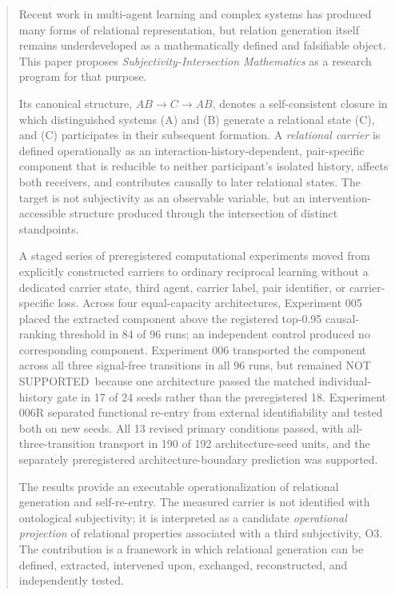 \documentclass[11pt,a4paper]{article}
\newcommand{\ABclosure}{\(AB \rightarrow C \rightarrow AB\)}
\newcommand{\statusnotsupported}{\textsf{NOT SUPPORTED}}
\begin{document}
\begin{abstract}
Recent work in multi-agent learning and complex systems has produced many forms of relational representation, but relation generation itself remains underdeveloped as a mathematically defined and falsifiable object. This paper proposes \emph{Subjectivity-Intersection Mathematics} as a research program for that purpose.

Its canonical structure, \ABclosure, denotes a self-consistent closure in which distinguished systems (A) and (B) generate a relational state (C), and (C) participates in their subsequent formation. A \emph{relational carrier} is defined operationally as an interaction-history-dependent, pair-specific component that is reducible to neither participant's isolated history, affects both receivers, and contributes causally to later relational states. The target is not subjectivity as an observable variable, but an intervention-accessible structure produced through the intersection of distinct standpoints.

A staged series of preregistered computational experiments moved from explicitly constructed carriers to ordinary reciprocal learning without a dedicated carrier state, third agent, carrier label, pair identifier, or carrier-specific loss. Across four equal-capacity architectures, Experiment 005 placed the extracted component above the registered top-0.95 causal-ranking threshold in 84 of 96 runs; an independent control produced no corresponding component. Experiment 006 transported the component across all three signal-free transitions in all 96 runs, but remained \statusnotsupported\ because one architecture passed the matched individual-history gate in 17 of 24 seeds rather than the preregistered 18. Experiment 006R separated functional re-entry from external identifiability and tested both on new seeds. All 13 revised primary conditions passed, with all-three-transition transport in 190 of 192 architecture-seed units, and the separately preregistered architecture-boundary prediction was supported.

The results provide an executable operationalization of relational generation and self-re-entry. The measured carrier is not identified with ontological subjectivity; it is interpreted as a candidate \emph{operational projection} of relational properties associated with a third subjectivity, O3. The contribution is a framework in which relational generation can be defined, extracted, intervened upon, exchanged, reconstructed, and independently tested.
\end{abstract}
\end{document}
